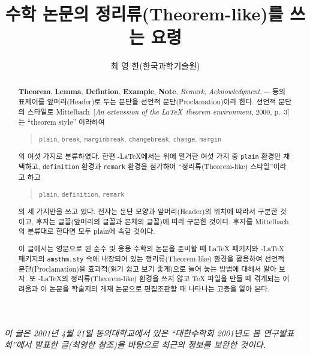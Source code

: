 \documentclass[a4paper,10pt]{amsproc}
\title{수학 논문의 정리류(Theorem-like)를 쓰는 요령}
\author[최 영 한]{최 영 한\;(한국과학기술원)}
\newcommand\amsthmstyle{\texttt{amsthm.sty}}
\newenvironment{headnote}%
     {\small\itshape\noindent\ignorespaces}%
     {\vskip2\baselineskip\ignorespaces}
\newcommand\env[1]{\texttt{#1}}
\newcommand\cntrdot{\raisebox{.2ex}{\;\bfseries\textperiodcentered\;}}
\begin{document}
\begin{headnote}
  이 글은 2001년 4월 21일 동의대학교에서 있은 ``대한수학회 2001년도 봄
  연구발표회''에서 발표한 글(최영한 \cite{ch02} 참조)을 바탕으로 최근의
  정보를 보완한 것이다.
\end{headnote}

\begin{abstract}
  \textbf{Theorem}, \textbf{Lemma}, \textbf{Defintion},
  \textbf{Example}, \textbf{Note}, \textit{Remark},
  \textit{Acknowledgment}, $\cdots$ 등의 표제어를 앞머리(Header)로 두는
  문단을 선언적 문단(Pro\-cla\-ma\-tion)이라 한다.  선언적 문단의 스타일로
  Mittelbach~[\textit{An extenssion of the \LaTeX~theorem
  environment}, 2000, p.~3]는 ``theorem style'' 이라하여
  \begin{quote}
     \env{plain}, \env{break}, \env{marginbreak},
     \env{changebreak}, \env{change}, \env{margin}
  \end{quote}
  의 여섯 가지로 분류하였다. 한편 \AmS-\LaTeX 에서는 위에
  열거한 여섯 가지 중 \env{plain} 환경만 채택하고,
  \env{definition} 환경과 \env{remark} 환경을 첨가하여
  ``정리류(Theorem-like) 스타일''이라고 하고
  \begin{quote}
   \env{plain}, \env{definition}, \env{remark}
  \end{quote}
  의 세 가지만을 쓰고 있다. 전자는 문단 모양과
  앞머리(Header)의 위치에 따라서 구분한 것이고, 후자는 글꼴(앞머리의
  글꼴과 본체의 글꼴)에 따라 구분한 것이다.  후자를 Mittelbach의
  분류대로 한다면 모두 plain에 속할 것이다.

  이 글에서는 영문으로 된 순수 및 응용 수학의 논문을 준비할 때
  \LaTeX{} 패키지와 \AmS-\LaTeX{} 패키지의 \amsthmstyle{} 속에
  내장되어 있는 정리류(Theorem-like) 환경을 활용하여 선언적
  문단(Proclamation)을 효과적(읽기 쉽고 보기 좋게)으로 늘어 놓는
  방법에 대해서 알아 보자. 또 \AmS-\LaTeX 의 정리류(Theorem-like)
  환경을 쓰지 않고 \TeX{} 파일을 만들 때 겪게되는 어려움과 이 논문을
  학술지의 게재 논문으로 편집\cntrdot 조판할 때 나타나는
  고충을 알아 본다.
\end{abstract}

\maketitle
\end{document}
